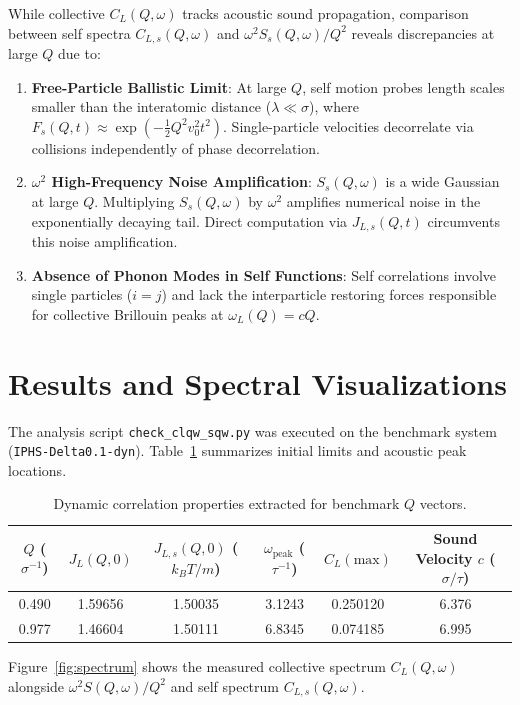 \documentclass[11pt,a4paper]{article}
\begin{document}
While collective $C_L(Q,\omega)$ tracks acoustic sound propagation, comparison between self spectra $C_{L,s}(Q,\omega)$ and $\omega^2 S_s(Q,\omega)/Q^2$ reveals discrepancies at large $Q$ due to:
\begin{enumerate}
    \item \textbf{Free-Particle Ballistic Limit}: At large $Q$, self motion probes length scales smaller than the interatomic distance ($\lambda \ll \sigma$), where $F_s(Q,t) \approx \exp\left(-\frac{1}{2} Q^2 v_0^2 t^2\right)$. Single-particle velocities decorrelate via collisions independently of phase decorrelation.
    \item \textbf{$\omega^2$ High-Frequency Noise Amplification}: $S_s(Q,\omega)$ is a wide Gaussian at large $Q$. Multiplying $S_s(Q,\omega)$ by $\omega^2$ amplifies numerical noise in the exponentially decaying tail. Direct computation via $J_{L,s}(Q,t)$ circumvents this noise amplification.
    \item \textbf{Absence of Phonon Modes in Self Functions}: Self correlations involve single particles ($i=j$) and lack the interparticle restoring forces responsible for collective Brillouin peaks at $\omega_L(Q) = c Q$.
\end{enumerate}

\section{Results and Spectral Visualizations}

The analysis script \texttt{check\_clqw\_sqw.py} was executed on the benchmark system (\texttt{IPHS-Delta0.1-dyn}). Table~\ref{tab:results} summarizes initial limits and acoustic peak locations.

\begin{table}[h!]
\centering
\caption{Dynamic correlation properties extracted for benchmark $Q$ vectors.}
\label{tab:results}
\begin{tabular}{cccccc}
\toprule
$Q$ ($\sigma^{-1}$) & $J_L(Q,0)$ & $J_{L,s}(Q,0)$ ($k_B T/m$) & $\omega_{\text{peak}}$ ($\tau^{-1}$) & $C_L(\text{max})$ & Sound Velocity $c$ ($\sigma/\tau$) \\
\midrule
0.490 & 1.59656 & 1.50035 & 3.1243 & 0.250120 & 6.376 \\
0.977 & 1.46604 & 1.50111 & 6.8345 & 0.074185 & 6.995 \\
\bottomrule
\end{tabular}
\end{table}

Figure~\ref{fig:spectrum} shows the measured collective spectrum $C_L(Q,\omega)$ alongside $\omega^2 S(Q,\omega)/Q^2$ and self spectrum $C_{L,s}(Q,\omega)$.
\end{document}
